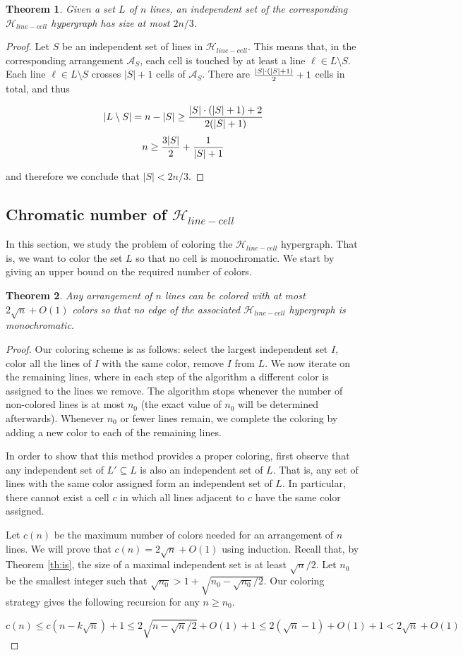 \documentclass[11pt,a4paper]{article}
\newtheorem{theorem}{Theorem}
\newcommand{\Hlinecell}{{\mathcal H}_{line-cell}}
\begin{document}
\begin{theorem}\label{th:ubis}
Given a set $L$ of $n$ lines, an independent set of the corresponding $\Hlinecell$ hypergraph has size at most $2n / 3$.
\end{theorem}
\begin{proof}
Let $S$ be an independent set of lines in $\Hlinecell$. This means that, in the corresponding arrangement $\mathcal{A}_{S}$, each cell is touched by at least a line $\ell \in L \setminus S$. Each line $\ell \in L\setminus S$ crosses $|S|+1$ cells of $\mathcal{A}_{S}$. There are ${|S| \cdot (|S|+1) \over 2}+1$ cells in total, and thus

$$|L \setminus S| = n - |S| \ge {|S| \cdot (|S|+1) +2 \over 2 (|S|+1)} $$
$$n \ge {3|S|\over 2}+{1\over |S|+1}$$

\noindent and therefore we conclude that $|S| < {2n/3}$.
\end{proof}

\subsection{Chromatic number of $\Hlinecell$}
In this section, we study the problem of coloring the $\Hlinecell$ hypergraph. That is, we want to color the set $L$ so that no cell is monochromatic. We start by giving an upper bound on the required number of colors.

\begin{theorem}\label{UB:chrom}
Any arrangement of $n$ lines can be colored with at most $2\sqrt{n}+O(1)$ colors so that no edge of the associated $\Hlinecell$ hypergraph is monochromatic.
\end{theorem}
\begin{proof}
Our coloring scheme is as follows: select the largest independent set $I$, color all the lines of $I$ with the same color, remove $I$ from $L$. We now iterate on the remaining lines, where in each step of the algorithm a different color is assigned to the lines we remove. The algorithm stops whenever the number of non-colored lines is at most $n_0$ (the exact value of $n_0$ will be determined afterwards). Whenever $n_0$ or fewer lines remain, we complete the coloring by adding a new color to each of the remaining lines. 

In order to show that this method provides a proper coloring, first observe that any independent set of $L' \subseteq L$ is also an independent set of $L$. That is, any set of lines with the same color assigned form an independent set of $L$. In particular, there cannot exist a cell $c$ in which all lines adjacent to $c$ have the same color assigned.

Let $c(n)$ be the maximum number of colors needed for an arrangement of $n$ lines. We will prove that $c(n)=2\sqrt{n}+O(1)$ using induction. Recall that, by Theorem \ref{th:is}, the size of a maximal independent set is at least $\sqrt{n}/2$. Let $n_0$ be the smallest integer such that $\sqrt{n_0}>1+\sqrt{n_0-\sqrt{n_0}/2}$. Our coloring strategy gives the following recursion for any $n\geq n_0$. 

$$ c(n)\leq c(n-k\sqrt{n})+1 \leq 2\sqrt{n-\sqrt{n}/2}+O(1)+1 \leq 2(\sqrt{n}-1) +O(1)+1 < 2\sqrt{n} +O(1)$$
\end{proof}
\end{document}
